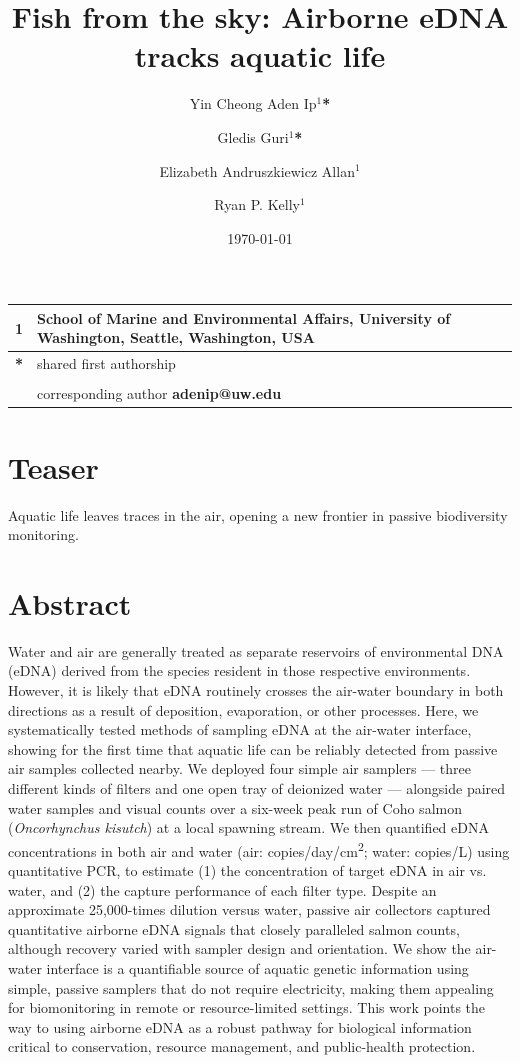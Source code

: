 \documentclass{article}
\title{Fish from the sky: Airborne eDNA tracks aquatic life}
\author{Yin Cheong Aden Ip$^1$\textbf{*} \and
Gledis Guri$^1$\textbf{*} \and
Elizabeth Andruszkiewicz Allan$^1$ \and
Ryan P. Kelly$^1$}
\date{\today}
\begin{document}
\maketitle

\section*{}

\begin{center}
\begin{tabular}{ll}
1 & School of Marine and Environmental Affairs, University of Washington, Seattle, Washington, USA \\
\hline
\textbf{*} & shared first authorship\\
&\\
& corresponding author \textbf{adenip@uw.edu}
\end{tabular}
\end{center}

\section*{Teaser}
Aquatic life leaves traces in the air, opening a new frontier in passive biodiversity monitoring.

\section*{Abstract}
Water and air are generally treated as separate reservoirs of environmental DNA (eDNA) derived from the species resident in those respective environments. However, it is likely that eDNA routinely crosses the air-water boundary in both directions as a result of deposition, evaporation, or other processes. Here, we systematically tested methods of sampling eDNA at the air-water interface, showing for the first time that aquatic life can be reliably detected from passive air samples collected nearby. We deployed four simple air samplers — three different kinds of filters and one open tray of deionized water — alongside paired water samples and visual counts over a six-week peak run of Coho salmon (\textit{Oncorhynchus kisutch}) at a local spawning stream. We then quantified eDNA concentrations in both air and water (air: copies/day/cm\textsuperscript{2}; water: copies/L) using quantitative PCR, to estimate (1) the concentration of target eDNA in air vs. water, and (2) the capture performance of each filter type. Despite an approximate 25,000-times dilution versus water, passive air collectors captured quantitative airborne eDNA signals that closely paralleled salmon counts, although recovery varied with sampler design and orientation. We show the air-water interface is a quantifiable source of aquatic genetic information using simple, passive samplers that do not require electricity, making them appealing for biomonitoring in remote or resource-limited settings. This work points the way to using airborne eDNA as a robust pathway for biological information critical to conservation, resource management, and public-health protection.
\end{document}
